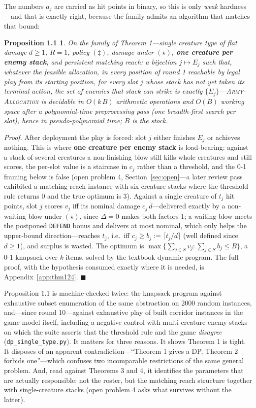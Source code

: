 \documentclass[11pt,a4paper]{article}
\theoremstyle{plain}
\newtheorem*{propdp}{Proposition 1.1}
\theoremstyle{definition}
\theoremstyle{plain}
\theoremstyle{definition}
\theoremstyle{remark}
\newcommand{\ALLOC}{\textsc{Army-Allocation}}
\newcommand{\src}[1]{\texttt{#1}}
\newcommand{\qedbox}{\hfill$\blacksquare$}
\begin{document}
\smallskip
The numbers $a_j$ are carried as hit points in binary, so this is only \emph{weak}
hardness---and that is exactly right, because the family admits an algorithm that matches
that bound:

\begin{propdp}
On the family of Theorem 1---single creature type of flat damage $d\ge1$, $R=1$, policy
$(\ddagger)$, damage under $(\star)$, \textbf{one creature per enemy stack}, and
\emph{persistent matching reach}: a bijection $j\mapsto E_j$ such that, whatever the
feasible allocation, in every position of
round 1 reachable by legal play from its starting position, for every slot $j$ whose stack has \emph{not yet taken its
terminal action}, the set of enemies that stack can strike is exactly
$\{E_j\}$---\ALLOC{} is decidable in $O(k\,B)$ arithmetic operations and $O(B)$ working space
after a polynomial-time preprocessing pass (one breadth-first search per slot), hence in
pseudo-polynomial time; $B$ is the stock.
\end{propdp}

\noindent\emph{Proof.} After deployment the play is forced: slot $j$ either finishes $E_j$ or
achieves nothing. This is where \textbf{one creature per enemy stack} is load-bearing: against
a stack of several creatures a non-finishing blow still kills whole creatures and still
scores, the per-slot value is a staircase in $c_j$ rather than a threshold, and the 0-1
framing below is false (open problem 4, Section~\ref{sec:open}---a later review pass
exhibited a matching-reach instance with six-creature stacks where the threshold rule returns
$0$ and the true optimum is $3$). Against a single creature of $t_j$ hit points, slot $j$ scores $v_j$
iff its nominal damage $c_j\,d$---delivered exactly by a non-waiting blow under $(\star)$,
since $\Delta=0$ makes both factors $1$; a waiting blow meets the postponed \texttt{DEFEND}
bonus and delivers at most nominal, which only helps the upper-bound
direction---reaches $t_j$, i.e.\ iff $c_j\ge b_j:=\lceil t_j/d\rceil$ (well defined since
$d\ge1$), and surplus is wasted. The optimum is
$\max\{\sum_{j\in S}v_j:\sum_{j\in S}b_j\le B\}$, a 0-1 knapsack over $k$ items, solved by
the textbook dynamic program. The full proof, with the hypothesis consumed exactly where it
is needed, is Appendix~\ref{app:thm124}. \qedbox

\smallskip
Proposition 1.1 is machine-checked twice: the knapsack program against exhaustive subset
enumeration of the same abstraction on 2000 random instances, and---since round 10---against
exhaustive play of built corridor instances in the game model itself, including a negative
control with multi-creature enemy stacks on which the suite asserts that the threshold rule
and the game \emph{disagree} (\src{dp\_single\_type.py}). It matters for three reasons. It
shows Theorem 1 is tight. It disposes of an apparent contradiction---``Theorem 1 gives a DP,
Theorem 2 forbids one''---which confuses two incomparable restrictions of the same general
problem. And, read against Theorems 3 and 4, it identifies the parameters that are actually
responsible: not the roster, but the matching reach structure together with single-creature
stacks (open problem 4 asks what survives without the latter).
\end{document}
